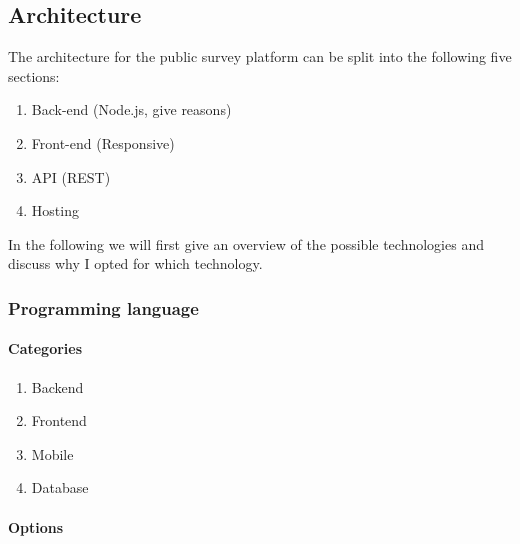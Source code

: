 
\subsection{Architecture}
\label{4b_architecture}


The architecture for the public survey platform can be split into the following five sections:

\begin{enumerate}[itemsep=0pt] 
\item Back-end (Node.js, give reasons)
\item Front-end (Responsive)
\item API (REST)
\item Hosting
\end{enumerate}

In the following we will first give an overview of the possible technologies and discuss why I opted for which technology.




\subsubsection{Programming language}

\paragraph{Categories}

\begin{enumerate}
\item Backend
\item Frontend
\item Mobile
\item Database
\end{enumerate}



\paragraph{Options}


